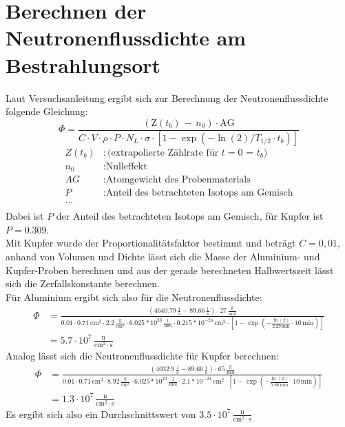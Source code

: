 \documentclass[12pt,german]{article}
\begin{document}
    \section{Berechnen der Neutronenflussdichte am Bestrahlungsort}
    Laut Versuchsanleitung ergibt sich zur Berechnung der Neutronenflussdichte folgende Gleichung:
    \begin{equation*}
        \Phi = \frac{\left(\text{Z}(t_b)\, -\, n_0\right) \cdot \text{AG}}{C \cdot V \cdot \rho \cdot P \cdot N_L \cdot \sigma \cdot \left[1 - \exp(-\ln(2)/T_{1/2} \cdot t_b)\right]}
    \end{equation*}
    \begin{align*}
        Z(t_b) &: \text{(extrapolierte Zählrate für $t = 0$ = $t_b$)} \\
        n_0 &: \text{Nulleffekt} \\
        AG &: \text{Atomgewicht des Probenmaterials} \\
        P &: \text{Anteil des betrachteten Isotops am Gemisch} \\
        ... \\
    \end{align*}
    Dabei ist $P$ der Anteil des betrachteten Isotops am Gemisch, für Kupfer ist $P = 0.309$. \\
    Mit Kupfer wurde der Proportionalitätsfaktor bestimmt und beträgt $C = 0,01$, anhand von Volumen und Dichte lässt sich die Masse der Aluminium- und Kupfer-Proben berechnen und aus der gerade berechneten Halbwertszeit lässt sich die Zerfallskonstante berechnen. \\
    Für Aluminium ergibt sich also für die Neutronenflussdichte:
    \begin{align*}
        \Phi &= \frac{\left(4640.79\, \frac{1}{\text{s}} - 89.66\, \frac{1}{\text{s}}\right) \cdot 27\, \frac{\text{g}}{\text{mol}}}{0.01 \cdot 0.71\, \text{cm}^3 \cdot 2.2\, \frac{\text{g}}{\text{cm}^3} \cdot 6.025 * 10^{23}\, \frac{1}{\text{mol}} \cdot 0.215 * 10^{-24}\, \text{cm}^2 \cdot \left[1 - \exp\left(- \frac{\ln(2)}{2.29\, \text{min}} \cdot 10\, \text{min}\right)\right]} \\
             &= 5.7 \cdot 10^7\, \frac{\text{n}}{\text{cm}^2 \cdot \text{s}}
    \end{align*}
    Analog lässt sich die Neutronenflussdichte für Kupfer berechnen:
    \begin{align*}
        \Phi &= \frac{\left(4032.9\, \frac{1}{\text{s}} - 89.66\, \frac{1}{\text{s}}\right) \cdot 65\, \frac{\text{g}}{\text{mol}}}{0.01 \cdot 0.71\, \text{cm}^3 \cdot 8.92\, \frac{\text{g}}{\text{cm}^3} \cdot 6.025 * 10^{23}\, \frac{1}{\text{mol}} \cdot 2.1 * 10^{-24}\, \text{cm}^2 \cdot \left[1 - \exp\left(- \frac{\ln(2)}{5.86\, \text{min}} \cdot 10\, \text{min}\right)\right]} \\
             &= 1.3 \cdot 10^7\, \frac{\text{n}}{\text{cm}^2 \cdot \text{s}}
    \end{align*}
    Es ergibt sich also ein Durchschnittswert von $3.5 \cdot 10^7\, \frac{\text{n}}{\text{cm}^2 \cdot \text{s}}$
\end{document}
